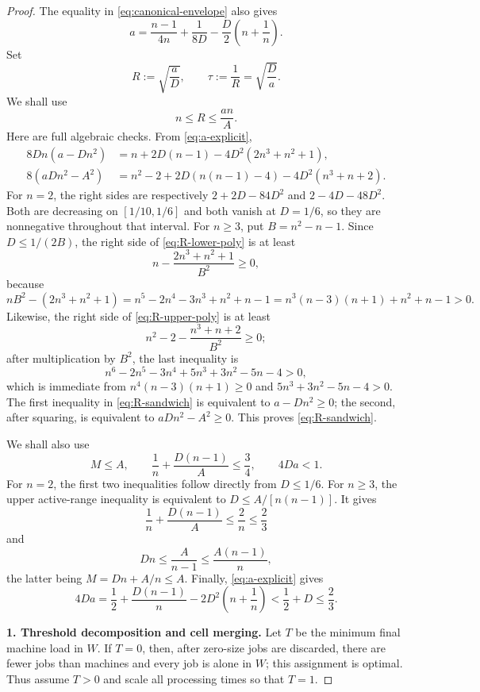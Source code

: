 \documentclass[11pt]{article}
\theoremstyle{remark}
\begin{document}
\begin{proof}
The equality in \eqref{eq:canonical-envelope} also gives
\begin{equation}\label{eq:a-explicit}
 a=\frac{n-1}{4n}+\frac1{8D}
       -\frac D2\left(n+\frac1n\right).
\end{equation}
Set
\begin{equation}\label{eq:R-def}
 R:=\sqrt{\frac aD},\qquad \tau:=\frac1R=\sqrt{\frac Da}.
\end{equation}
We shall use
\begin{equation}\label{eq:R-sandwich}
 n\leq R\leq\frac{an}{A}.
\end{equation}
Here are full algebraic checks.  From \eqref{eq:a-explicit},
\begin{align}
 8Dn(a-Dn^2)
 &=n+2D(n-1)-4D^2(2n^3+n^2+1),\label{eq:R-lower-poly}\\
 8(aDn^2-A^2)
 &=n^2-2+2D(n(n-1)-4)-4D^2(n^3+n+2).
 \label{eq:R-upper-poly}
\end{align}
For $n=2$, the right sides are respectively $2+2D-84D^2$
and $2-4D-48D^2$.  Both are decreasing on
$[1/10,1/6]$ and both vanish at \(D=1/6\), so they are nonnegative
throughout that interval.  For $n\geq3$, put $B=n^2-n-1$.  Since
$D\leq1/(2B)$, the right side of \eqref{eq:R-lower-poly} is at least
\[
 n-\frac{2n^3+n^2+1}{B^2}\geq0,
\]
because
\[
 nB^2-(2n^3+n^2+1)
 =n^5-2n^4-3n^3+n^2+n-1
 =n^3(n-3)(n+1)+n^2+n-1>0.
\]
Likewise, the right side of \eqref{eq:R-upper-poly} is at least
\[
 n^2-2-\frac{n^3+n+2}{B^2}\geq0;
\]
after multiplication by $B^2$, the last inequality is
\[
 n^6-2n^5-3n^4+5n^3+3n^2-5n-4>0,
\]
which is immediate from
$n^4(n-3)(n+1)\geq0$ and
$5n^3+3n^2-5n-4>0$.  The first inequality in
\eqref{eq:R-sandwich} is equivalent to
$a-Dn^2\geq0$; the second, after squaring, is equivalent to
$aDn^2-A^2\geq0$.  This proves \eqref{eq:R-sandwich}.

We shall also use
\begin{equation}\label{eq:remaining-parameter-inequalities}
 M\leq A,\qquad
 \frac1n+\frac{D(n-1)}A\leq\frac34,\qquad
 4Da<1.
\end{equation}
For $n=2$, the first two inequalities follow directly from
$D\leq1/6$.  For $n\geq3$, the upper active-range inequality is
equivalent to $D\leq A/[n(n-1)]$.  It gives
\[
 \frac1n+\frac{D(n-1)}A\leq\frac2n\leq\frac23
\]
and
\[
 Dn\leq\frac A{n-1}\leq\frac{A(n-1)}n,
\]
the latter being $M=Dn+A/n\leq A$.  Finally,
\eqref{eq:a-explicit} gives
\[
 4Da=\frac12+\frac{D(n-1)}n
        -2D^2\left(n+\frac1n\right)
 <\frac12+D\leq\frac23.
\]

\medskip
\noindent
\textbf{1. Threshold decomposition and cell merging.}
Let $T$ be the minimum final machine load in $W$.  If $T=0$,
then, after zero-size jobs are discarded, there are fewer jobs than
machines and every job is alone in $W$; this assignment is optimal.
Thus assume $T>0$ and scale all processing times so that $T=1$.


\end{proof}
\end{document}
